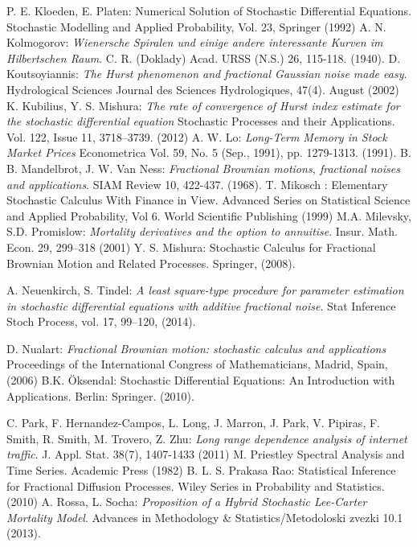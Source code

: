 \documentclass[smallextended]{svjour3}
\begin{document}
\begin{thebibliography}{99}
     P. E. Kloeden, E. Platen: Numerical Solution of Stochastic
    Differential Equations. Stochastic
    Modelling and Applied Probability, Vol. 23, Springer (1992)
      A. N. Kolmogorov: {\it Wienersche Spiralen und einige andere
    interessante Kurven  im
        Hilbertschen Raum}. C. R. (Doklady) Acad. URSS (N.S.) 26, 115-118.
        (1940).
     D. Koutsoyiannis: {\it The Hurst phenomenon and fractional
    Gaussian noise made easy}.
    Hydrological Sciences Journal des Sciences Hydrologiques, 47(4). August
    (2002)
     K. Kubilius, Y. S. Mishura: {\it The rate of convergence of
    Hurst index estimate for the stochastic differential equation}
    Stochastic Processes and their Applications. Vol. 122, Issue 11,
    3718–3739. (2012)
     A. W. Lo: {\it Long-Term Memory in Stock Market Prices}
    Econometrica Vol. 59, No. 5 (Sep., 1991), pp. 1279-1313. (1991).
      B. B. Mandelbrot, J. W. Van Ness: {\it Fractional Brownian
    motions, fractional noises and
        applications}. SIAM Review 10, 422-437. (1968).
     T. Mikosch : Elementary Stochastic Calculus With Finance in
    View. Advanced Series on Statistical Science and Applied
    Probability, Vol 6. World Scientific Publishing (1999)
      M.A. Milevsky, S.D. Promislow: {\it Mortality derivatives
    and the option to annuitise}. Insur. Math.
    Econ. 29, 299–318 (2001)
      Y. S. Mishura: Stochastic Calculus for Fractional Brownian
    Motion and Related Processes.
    Springer, (2008).

     A. Neuenkirch, S. Tindel: {\it A least square-type
    procedure for parameter estimation in stochastic differential
        equations with additive fractional noise}. Stat Inference Stoch
        Process, vol. 17, 99–120, (2014).


     D. Nualart: {\it Fractional Brownian motion: stochastic
    calculus and applications }
    Proceedings of the International Congress of Mathematicians, Madrid, Spain,
    (2006)
     B.K. \"Oksendal: Stochastic Differential Equations: An
    Introduction with Applications. Berlin: Springer.  (2010).

     C. Park, F. Hernandez-Campos, L. Long, J. Marron, J.
    Park, V. Pipiras, F. Smith, R. Smith, M. Trovero, Z. Zhu:
    {\it Long range dependence analysis of internet traffic}. J. Appl. Stat.
    38(7), 1407-1433 (2011)
     M. Priestley Spectral Analysis and Time Series.
    Academic Press (1982)
     B. L. S. Prakasa Rao: Statistical Inference for Fractional
    Diffusion Processes. Wiley Series in Probability and Statistics.
    (2010)
     A. Rossa, L. Socha: {\it Proposition of a Hybrid Stochastic
    Lee-Carter Mortality Model}. Advances in Methodology \&
    Statistics/Metodoloski zvezki 10.1 (2013).



\end{thebibliography}
\end{document}
